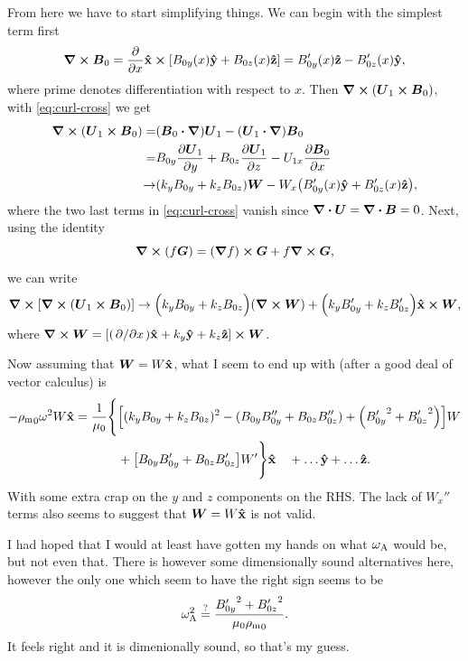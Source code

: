 \documentclass[11pt,a4paper, 
swedish, english %
]{article}
\newcommand{\rhom}{\ensuremath{{\rho_{\text{m}}}}}
\begin{document}
From here we have to start simplifying things. We can begin with the
simplest term first
\begin{equation}
\curl\vb*B_0=\pdv{x}\vu{x}\cross
\qty[B_{0y}(x)\vu{y}+B_{0z}(x)\vu{z}]
=B_{0y}'(x)\vu{z}-B_{0z}'(x)\vu{y},
\end{equation}
where prime denotes differentiation with respect to $x$.
Then $\curl\qty(\vb*U_1\cross\vb*B_0)$, with \eqref{eq:curl-cross} we
get 
\begin{equation}
\begin{aligned}
\curl\qty(\vb*U_1\cross\vb*B_0) 
=& (\vb*B_0\vdot\grad)\vb*U_1
- (\vb*U_1\vdot\grad)\vb*B_0\\
=&B_{0y}\pdv{\vb*U_1}{y}+B_{0z}\pdv{\vb*U_1}{z}
-U_{1x}\pdv{\vb*B_0}{x}\\
\to& (k_y B_{0y} + k_z B_{0z}) \vb*W 
-W_{x}\qty(B_{0y}'(x)\vu{y} + B_{0z}'(x)\vu{z}),
\end{aligned}
\end{equation}
where the two last terms in \eqref{eq:curl-cross} vanish since
$\div\vb*U=\div\vb*B=0$. Next, using the identity
\begin{equation}
\curl(f\vb*G) = (\grad f)\cross\vb*G+f\curl\vb*G,
\end{equation}
we can write
\begin{equation}
\curl\qty[\curl\qty(\vb*U_1\cross\vb*B_0)]
\to \Big(k_yB_{0y}+k_zB_{0z}\Big)(\curl\vb*W)
+\Big(k_yB_{0y}'+k_zB_{0z}'\Big)\vu{x}\cross\vb*W,
\end{equation}
where $\curl\vb*W=[(\pdv*{x})\vu{x}+k_y\vu{y}+k_z\vu{z}]\cross\vb*W$.

Now assuming\footnotemark{} that $\vb*W=W\vu{x}$, what I seem to end
up with (after a good deal of vector calculus) is
\begin{equation}
\begin{aligned}
-\rhom_0\omega^2W\vu{x}=
\frac{1}{\mu_0}\Bigg\{&\qty[(k_yB_{0y}+k_zB_{0z})^2
-(B_{0y}B_{0y}''+B_{0z}B_{0z}'')
+\qty({B_{0y}'}^2+{B_{0z}'}^2)]W\\
&+\qty[B_{0y}B_{0y}'+B_{0z}B_{0z}']W'
\Bigg\}\vu{x}\quad
 +\ldots\vu{y} +\ldots\vu{z}.
\end{aligned}
\end{equation}
With some extra crap on the $y$ and $z$ components on the RHS. The
lack of $W_x''$ terms also seems to suggest that $\vb*W=W\vu{x}$ is
not valid.

I had hoped that I would at least have gotten my hands on what $\omega_{\text{A}}$
would be, but not even that. There is however some dimensionally sound
alternatives here, however the only one which seem to have the right
sign seems to be 
\begin{equation}
\wA^2\stackrel{?}{=}\frac{{B_{0y}'}^2+{B_{0z}'}^2}{\mu_0\rhom_0}.
\end{equation}
It feels right and it is dimenionally sound, so that's my guess. 
\end{document}
